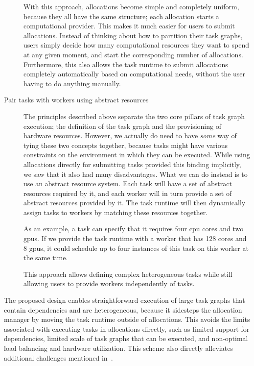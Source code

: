 \begin{description}
    With this approach, allocations become simple and completely uniform, because they all
    have the same structure; each allocation starts a computational provider. This makes it
    much easier for users to submit allocations. Instead of thinking about how to partition their task
    graphs, users simply decide how many computational resources they want to spend at any given moment,
    and start the corresponding number of allocations.
    Furthermore, this also allows the task runtime to submit allocations completely automatically based on
    computational needs, without the user having to do anything manually.
    \item[Pair tasks with workers using abstract resources] The principles described above separate the two core pillars of task graph execution; the
    definition of the task graph and the provisioning of hardware resources. However, we actually do
    need to have \emph{some} way of tying these two concepts together, because tasks might
    have various constraints on the environment in which they can be executed. While using allocations
    directly for submitting tasks provided this binding implicitly, we saw that it also had many disadvantages.
    What we can do instead is to use an abstract resource system. Each task will have a set of abstract resources
    required by it, and each worker will in turn provide a set of abstract resources provided by it.
    The task runtime will then dynamically assign tasks to workers by matching these resources together.

    As an example, a task can specify that it requires four \gls{cpu} cores and two \glspl{gpu}.
    If we provide the task runtime with a worker that has 128 cores and 8 \glspl{gpu},
    it could schedule up to four instances of this task on this worker at the same time.

    This approach allows defining complex heterogeneous tasks while still allowing users to provide workers independently
    of tasks.
\end{description}

The proposed design enables straightforward execution of large task graphs that contain dependencies and are
heterogeneous, because it sidesteps the allocation manager by moving the task runtime outside of allocations.
This avoids the limits associated with executing tasks in allocations directly, such as limited support for
dependencies, limited scale of task graphs that can be executed, and non-optimal load balancing and hardware utilization.
This scheme also directly alleviates additional challenges mentioned in~.

